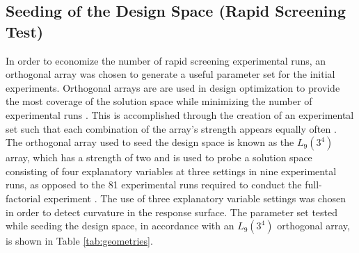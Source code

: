 \subsection{Seeding of the Design Space (Rapid Screening Test)}
\label{ssec:seeding}
In order to economize the number of rapid screening experimental runs, an orthogonal array was chosen to generate a useful parameter set for the initial experiments. Orthogonal arrays are are used in design optimization to provide the most coverage of the solution space while minimizing the number of experimental runs \cite{yokoyama1993taguchi}. This is accomplished through the creation of an experimental set such that each combination of the array's strength appears equally often \cite{hedayat2012orthogonal}. The orthogonal array used to seed the design space is known as the $L_9 (3^4)$ array, which has a strength of two and is used to probe a solution space consisting of four explanatory variables at three settings in nine experimental runs, as opposed to the 81 experimental runs required to conduct the full-factorial experiment \cite{hedayat2012orthogonal}. The use of three explanatory variable settings was chosen in order to detect curvature in the response surface. The parameter set tested while seeding the design space, in accordance with an $L_9 (3^4)$ orthogonal array, is shown in Table \ref{tab:geometries}.


